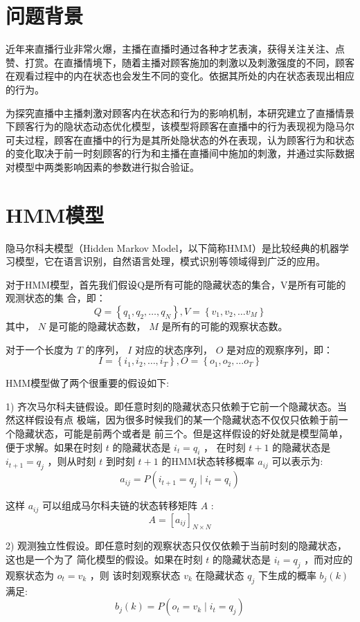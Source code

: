 \section{问题背景}
近年来直播行业非常火爆，主播在直播时通过各种才艺表演，获得关注关注、点赞、打赏。在直播情境下，随着主播对顾客施加的刺激以及刺激强度的不同，顾客在观看过程中的内在状态也会发生不同的变化。依据其所处的内在状态表现出相应的行为。

为探究直播中主播刺激对顾客内在状态和行为的影响机制，本研究建立了直播情景下顾客行为的隐状态动态优化模型，该模型将顾客在直播中的行为表现视为隐马尔可夫过程，顾客在直播中的行为是其所处隐状态的外在表现，认为顾客行为和状态的变化取决于前一时刻顾客的行为和主播在直播间中施加的刺激，并通过实际数据对模型中两类影响因素的参数进行拟合验证。
\section{HMM模型}
隐马尔科夫模型（Hidden Markov Model，以下简称HMM）是比较经典的机器学习模型，它在语言识别，自然语言处理，模式识别等领域得到广泛的应用。

对于HMM模型，首先我们假设Q是所有可能的隐藏状态的集合，V是所有可能的观测状态的集 合，即：
$$
Q=\left\{q_{1}, q_{2}, \ldots, q_{N}\right\}, V=\left\{v_{1}, v_{2}, \ldots v_{M}\right\}
$$
其中， $N$ 是可能的隐藏状态数， $M$ 是所有的可能的观察状态数。

对于一个长度为 $T$ 的序列， $I$ 对应的状态序列， $O$ 是对应的观察序列，即：
$$
I=\left\{i_{1}, i_{2}, \ldots, i_{T}\right\}, O=\left\{o_{1}, o_{2}, \ldots o_{T}\right\}
$$

HMM模型做了两个很重要的假设如下:

1) 齐次马尔科夫链假设。即任意时刻的隐藏状态只依赖于它前一个隐藏状态。当然这样假设有点 极端，因为很多时候我们的某一个隐藏状态不仅仅只依赖于前一个隐藏状态，可能是前两个或者是 前三个。但是这样假设的好处就是模型简单，便于求解。如果在时刻 $t$ 的隐藏状态是 $i_{t}=q_{i}$ ， 在时刻 $t+1$ 的隐藏状态是 $i_{t+1}=q_{j}$ ，则从时刻 $t$ 到时刻 $t+1$ 的HMM状态转移概率 $a_{i j}$ 可以表示为:
$$
a_{i j}=P\left(i_{t+1}=q_{j} \mid i_{t}=q_{i}\right)
$$

这样 $a_{i j}$ 可以组成马尔科夫链的状态转移矩阵 $A$ :
$$
A=\left[a_{i j}\right]_{N \times N}
$$

2) 观测独立性假设。即任意时刻的观察状态只仅仅依赖于当前时刻的隐藏状态，这也是一个为了 简化模型的假设。如果在时刻 $t$ 的隐藏状态是 $i_{t}=q_{j}$ ，而对应的观察状态为 $o_{t}=v_{k}$ ，则 该时刻观察状态 $v_{k}$ 在隐藏状态 $q_{j}$ 下生成的概率 $b_{j}(k)$ 满足:
$$
b_{j}(k)=P\left(o_{t}=v_{k} \mid i_{t}=q_{j}\right)
$$

